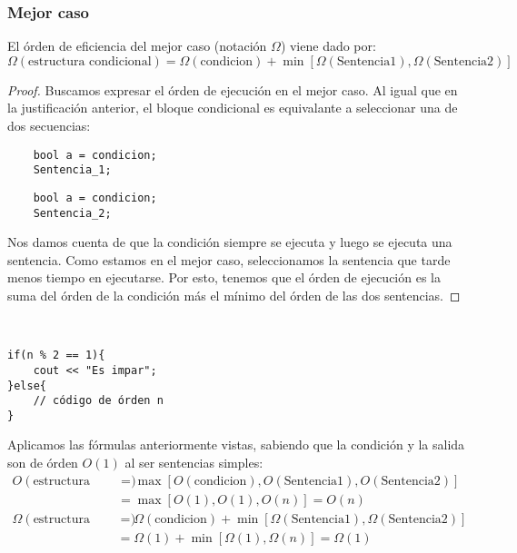 \subsubsection{Mejor caso}
El órden de eficiencia del mejor caso (notación $\Omega$) viene dado por:
\begin{equation*}
\Omega(\mbox{estructura condicional}) = \Omega(\mbox{condicion}) + \min\left[\Omega(\mbox{Sentencia1}), \Omega(\mbox{Sentencia2})\right]
\end{equation*}
\begin{proof}
Buscamos expresar el órden de ejecución en el mejor caso. Al igual que en la justificación anterior, el bloque condicional es equivalante a seleccionar una de dos secuencias:
\begin{listing}[H]
    \begin{verbatim}
    bool a = condicion;
    Sentencia_1;
    \end{verbatim}
\end{listing}
\begin{listing}[H]
    \begin{verbatim}
    bool a = condicion;
    Sentencia_2;
    \end{verbatim}
\end{listing}
Nos damos cuenta de que la condición siempre se ejecuta y luego se ejecuta una sentencia. Como estamos en el mejor caso, seleccionamos la sentencia que tarde menos tiempo en ejecutarse. Por esto, tenemos que el órden de ejecución es la suma del órden de la condición más el mínimo del órden de las dos sentencias.
\end{proof}

\begin{ejemplo}
\ \\
\begin{listing}[H]
\begin{verbatim}
if(n % 2 == 1){
    cout << "Es impar";
}else{
    // código de órden n
}
\end{verbatim}
\end{listing}
Aplicamos las fórmulas anteriormente vistas, sabiendo que la condición y la salida son de órden $O(1)$ al ser sentencias simples:
\begin{align*}
    O(\mbox{estructura condicional}) &= \max\left[O(\mbox{condicion}), O(\mbox{Sentencia1}), O(\mbox{Sentencia2})\right] \\
                                     &= \max\left[O(1), O(1), O(n)\right] = O(n)
\end{align*}
\begin{align*}
    \Omega(\mbox{estructura condicional}) &= \Omega(\mbox{condicion}) + \min\left[\Omega(\mbox{Sentencia1}), \Omega(\mbox{Sentencia2})\right] \\
                                          &= \Omega(1) + \min\left[\Omega(1), \Omega(n)\right] = \Omega(1)
\end{align*}

\end{ejemplo}


